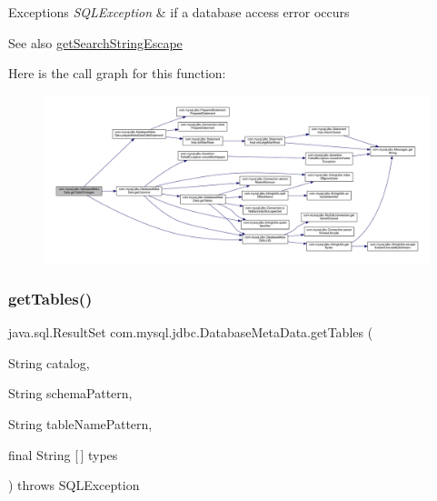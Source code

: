 \begin{DoxyExceptions}{Exceptions}
{\em S\+Q\+L\+Exception} & if a database access error occurs \\
\hline
\end{DoxyExceptions}
\begin{DoxySeeAlso}{See also}
\mbox{\hyperlink{classcom_1_1mysql_1_1jdbc_1_1_database_meta_data_a210b7942557a965c3af550074bb6fe9d}{get\+Search\+String\+Escape}} 
\end{DoxySeeAlso}
Here is the call graph for this function\+:
\nopagebreak
\begin{figure}[H]
\begin{center}
\leavevmode
\includegraphics[width=350pt]{classcom_1_1mysql_1_1jdbc_1_1_database_meta_data_a3c5930c79653f91ef2ce808d3cd37b45_cgraph}
\end{center}
\end{figure}
\mbox{\label{classcom_1_1mysql_1_1jdbc_1_1_database_meta_data_a09e2c74e6c817b349d43feea682eed58}} 
\subsubsection{\texorpdfstring{get\+Tables()}{getTables()}}
{\footnotesize\ttfamily java.\+sql.\+Result\+Set com.\+mysql.\+jdbc.\+Database\+Meta\+Data.\+get\+Tables (\begin{DoxyParamCaption}\item[{String}]{catalog,  }\item[{String}]{schema\+Pattern,  }\item[{String}]{table\+Name\+Pattern,  }\item[{final String \mbox{[}$\,$\mbox{]}}]{types }\end{DoxyParamCaption}) throws S\+Q\+L\+Exception}

